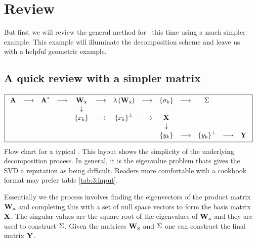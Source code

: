 \section{Review}
But first we will review the general method for \svdl \ this time using a much simpler example. This example will illuminate the decomposition scheme and leave us with a helpful geometric example.

\begin{landscape}
\thispagestyle{empty}
\subsection{A quick review with a simpler matrix}
\begin{equation}
\boxed{
  \begin{array}{ccccccccccccc}
  \textbf{A}^{\mathrm{}}&\longrightarrow&\textbf{A}^{\mathrm{*}}&\longrightarrow&\textbf{W}_{\mathrm{x}}&\longrightarrow&\lambda\left( \textbf{W}_{\mathrm{x}} \right)&\longrightarrow&\left\{ \sigma_{k} \right\}&\longrightarrow&\Sigma^{\mathrm{}}\\
  &&&&\downarrow\\
  &&&&\left\{ x_{k} \right\}&\longrightarrow&\left\{ x_{k} \right\}^{\perp}&\longrightarrow&\textbf{X}^{\mathrm{}}\\
  &&&&&&&&\downarrow\\
  &&&&&&&&\left\{ y_{k} \right\}&\longrightarrow&\left\{ y_{k} \right\}^{\perp}&\longrightarrow&\textbf{Y}^{\mathrm{}}\\
  \end{array}
 }
\end{equation}
Flow chart for a typical \svdl. This layout shows the simplicity of the underlying decomposition process. In general, it is the eigenvalue problem thats gives the SVD a reputation as being difficult. Readers more comfortable with a cookbook format may prefer table \eqref{tab:3:input}.

Essentially we the process involves finding the eigenvectors of the product matrix $\textbf{W}_{\mathrm{x}}$ and completing this with a set of null space vectors to form the basis matrix $\textbf{X}^{\mathrm{}}$. The singular values are the square root of the eigenvalues of $\textbf{W}_{\mathrm{x}}$ and they are used to construct $\Sigma^{\mathrm{}}$. Given the matrices $\textbf{W}_{\mathrm{x}}$ and $\Sigma^{\mathrm{}}$ one can construct the final matrix $\textbf{Y}^{\mathrm{}}$.


\end{landscape}
